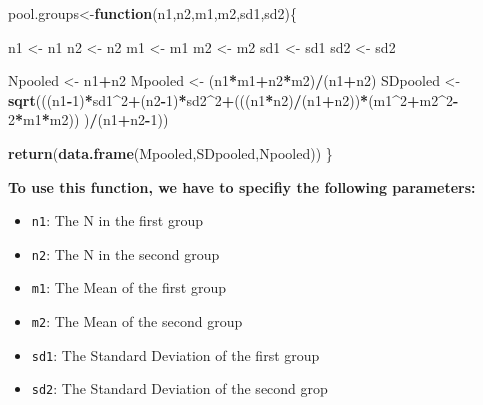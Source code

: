 \documentclass[]{book}
\newenvironment{Shaded}{\begin{snugshade}}{\end{snugshade}}
\newcommand{\KeywordTok}[1]{\textcolor[rgb]{0.13,0.29,0.53}{\textbf{#1}}}
\newcommand{\DecValTok}[1]{\textcolor[rgb]{0.00,0.00,0.81}{#1}}
\newcommand{\StringTok}[1]{\textcolor[rgb]{0.31,0.60,0.02}{#1}}
\newcommand{\ControlFlowTok}[1]{\textcolor[rgb]{0.13,0.29,0.53}{\textbf{#1}}}
\newcommand{\OperatorTok}[1]{\textcolor[rgb]{0.81,0.36,0.00}{\textbf{#1}}}
\newcommand{\NormalTok}[1]{#1}
\providecommand{\tightlist}{%
  \setlength{\itemsep}{0pt}\setlength{\parskip}{0pt}}
\theoremstyle{definition}
\theoremstyle{definition}
\theoremstyle{definition}
\theoremstyle{remark}
\begin{document}
\begin{Shaded}
\begin{Highlighting}[]
\NormalTok{pool.groups<-}\ControlFlowTok{function}\NormalTok{(n1,n2,m1,m2,sd1,sd2)\{}

\NormalTok{n1 <-}\StringTok{ }\NormalTok{n1}
\NormalTok{n2 <-}\StringTok{ }\NormalTok{n2}
\NormalTok{m1 <-}\StringTok{ }\NormalTok{m1}
\NormalTok{m2 <-}\StringTok{ }\NormalTok{m2}
\NormalTok{sd1 <-}\StringTok{ }\NormalTok{sd1}
\NormalTok{sd2 <-}\StringTok{ }\NormalTok{sd2}

\NormalTok{Npooled <-}\StringTok{ }\NormalTok{n1}\OperatorTok{+}\NormalTok{n2}
\NormalTok{Mpooled <-}\StringTok{ }\NormalTok{(n1}\OperatorTok{*}\NormalTok{m1}\OperatorTok{+}\NormalTok{n2}\OperatorTok{*}\NormalTok{m2)}\OperatorTok{/}\NormalTok{(n1}\OperatorTok{+}\NormalTok{n2)}
\NormalTok{SDpooled <-}\StringTok{ }\KeywordTok{sqrt}\NormalTok{(((n1}\OperatorTok{-}\DecValTok{1}\NormalTok{)}\OperatorTok{*}\NormalTok{sd1}\OperatorTok{^}\DecValTok{2}\OperatorTok{+}\NormalTok{(n2}\OperatorTok{-}\DecValTok{1}\NormalTok{)}\OperatorTok{*}\NormalTok{sd2}\OperatorTok{^}\DecValTok{2}\OperatorTok{+}\NormalTok{(((n1}\OperatorTok{*}\NormalTok{n2)}\OperatorTok{/}\NormalTok{(n1}\OperatorTok{+}\NormalTok{n2))}\OperatorTok{*}\NormalTok{(m1}\OperatorTok{^}\DecValTok{2}\OperatorTok{+}\NormalTok{m2}\OperatorTok{^}\DecValTok{2}\OperatorTok{-}\DecValTok{2}\OperatorTok{*}\NormalTok{m1}\OperatorTok{*}\NormalTok{m2))     )}\OperatorTok{/}\NormalTok{(n1}\OperatorTok{+}\NormalTok{n2}\OperatorTok{-}\DecValTok{1}\NormalTok{))}

\KeywordTok{return}\NormalTok{(}\KeywordTok{data.frame}\NormalTok{(Mpooled,SDpooled,Npooled))}
\NormalTok{\}}
\end{Highlighting}
\end{Shaded}

\textbf{To use this function, we have to specifiy the following
parameters:}

\begin{itemize}
\tightlist
\item
  \texttt{n1}: The N in the first group
\item
  \texttt{n2}: The N in the second group
\item
  \texttt{m1}: The Mean of the first group
\item
  \texttt{m2}: The Mean of the second group
\item
  \texttt{sd1}: The Standard Deviation of the first group
\item
  \texttt{sd2}: The Standard Deviation of the second grop
\end{itemize}
\end{document}
